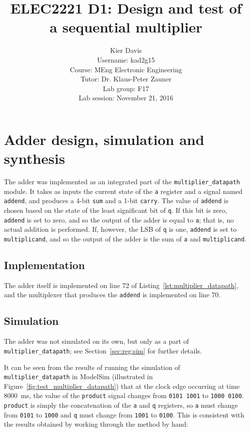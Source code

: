 \documentclass[a4paper]{article}
\title{ELEC2221 D1: Design and test of a sequential multiplier}
\author{Kier Davis \\
Username: kad2g15 \\
Course: MEng Electronic Engineering \\
Tutor: Dr. Klaus-Peter Zauner \\
Lab group: F17 \\
Lab session: November 21, 2016}
\begin{document}
\maketitle

\begin{abstract}
\end{abstract}

\section{Adder design, simulation and synthesis}
\label{sec:adder}

The adder was implemented as an integrated part of the \texttt{multiplier\_datapath} module. It takes as inputs the current state of the \texttt{a} register and a signal named \texttt{addend}, and produces a 4-bit \texttt{sum} and a 1-bit \texttt{carry}. The value of \texttt{addend} is chosen based on the state of the least significant bit of \texttt{q}. If this bit is zero, \texttt{addend} is set to zero, and so the output of the adder is equal to \texttt{a}; that is, no actual addition is performed. If, however, the LSB of \texttt{q} is one, \texttt{addend} is set to \texttt{multiplicand}, and so the output of the adder is the sum of \texttt{a} and \texttt{multiplicand}.

\subsection{Implementation}
\label{sec:adder:impl}

The adder itself is implemented on line 72 of Listing~\ref{lst:multiplier_datapath}, and the multiplexer that produces the \texttt{addend} is implemented on line 70.

\subsection{Simulation}
\label{sec:adder:sim}

The adder was not simulated on its own, but only as a part of \texttt{multiplier\_datapath}; see Section~\ref{sec:reg:sim} for further details.

It can be seen from the results of running the simulation of \texttt{multiplier\_datapath} in ModelSim (illustrated in Figure~\ref{fig:test_multiplier_datapath}) that at the clock edge occurring at time \SI{8000}{\milli\second}, the value of the \texttt{product} signal changes from \texttt{0101 1001} to \texttt{1000 0100}. \texttt{product} is simply the concatenation of the \texttt{a} and \texttt{q} registers, so \texttt{a} must change from \texttt{0101} to \texttt{1000} and \texttt{q} must change from \texttt{1001} to \texttt{0100}. This is consistent with the results obtained by working through the method by hand:
\end{document}
